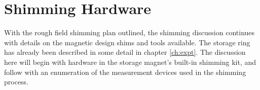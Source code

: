 \section{Shimming Hardware}

With the rough field shimming plan outlined, the shimming discussion continues with details on the magnetic design shims and tools available.  The storage ring has already been described in some detail in chapter \ref{ch:expt}.  The discussion here will begin with hardware in the storage magnet's built-in shimming kit, and follow with an enumeration of the measurement devices used in the shimming process.





